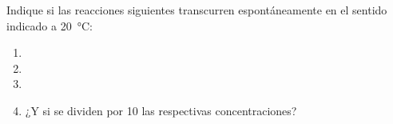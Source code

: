 Indique si las reacciones siguientes transcurren espontáneamente en el sentido indicado a \SI{20}{\celsius}:
\begin{enumerate}[label={\alph*)},font={\color{red!50!black}\bfseries}]
	\item{}
	\item{}
	\item{}
	\item¿Y si se dividen por 10 las respectivas concentraciones?
\end{enumerate}
